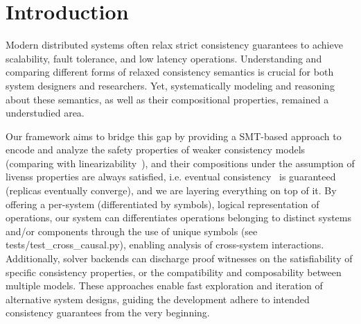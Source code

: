 \section{Introduction}

Modern distributed systems often relax strict consistency guarantees to achieve
scalability, fault tolerance, and low latency operations. Understanding and
comparing different forms of relaxed consistency semantics is crucial for both
system designers and researchers. Yet, systematically modeling and reasoning
about these semantics, as well as their compositional properties, remained a
understudied area.

Our framework aims to bridge this gap by providing a SMT-based approach to
encode and analyze the safety properties of weaker consistency models (comparing
with linearizability~\cite{herlihy1990linearizability}), and their
compositions under
the assumption of livenss properties are always satisfied, i.e. eventual
consistency~\cite{petersen1997flexible} is guaranteed (replicas
eventually converge),
and we are layering everything on top of it. By offering a per-system
(differentiated by symbols), logical representation of operations, our system
can differentiates operations belonging to distinct systems and/or components
through the use of unique symbols (see tests/test\_cross\_causal.py), enabling
analysis of cross-system interactions. Additionally, solver backends can
discharge proof witnesses on the satisfiability of specific consistency
properties, or the compatibility and composability between multiple models.
These approaches enable fast exploration and iteration of alternative system
designs, guiding the development adhere to intended consistency guarantees from
the very beginning.
